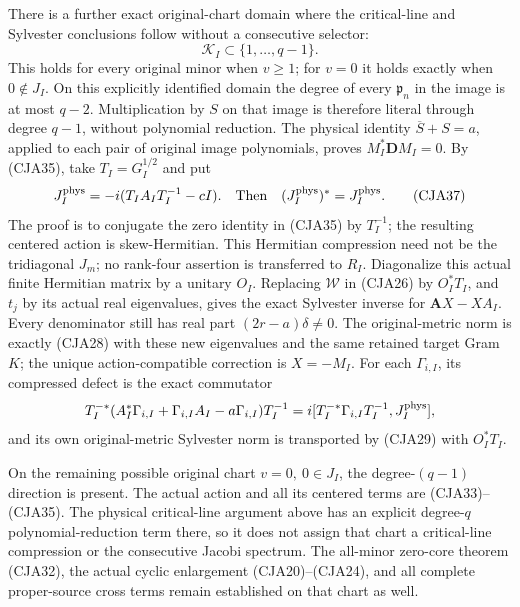 There is a further exact original-chart domain where the
critical-line and Sylvester conclusions follow without a
consecutive selector:
\begin{equation}
 \mathcal K_I\subset\{1,\ldots,q-1\}.
 \tag{CJA36}
\end{equation}
This holds for every original minor when \(v\geq1\); for \(v=0\)
it holds exactly when \(0\notin J_I\).
On this explicitly identified domain the degree of every
\(\mathfrak p_n\) in the image is at most \(q-2\).
Multiplication by \(S\) on that image is therefore literal
through degree \(q-1\), without polynomial reduction.
The physical identity \(\overline S+S=a\), applied to each pair
of original image polynomials, proves
\(M_I^*\mathbf DM_I=0\).
By (CJA35), take \(T_I=G_I^{1/2}\) and put
\begin{equation}
 J_I^{\rm phys}=-i(T_IA_IT_I^{-1}-cI).
 \quad\text{Then}\quad
 (J_I^{\rm phys})^*=J_I^{\rm phys}.
 \tag{CJA37}
\end{equation}
The proof is to conjugate the zero identity in (CJA35) by
\(T_I^{-1}\); the resulting centered action is skew-Hermitian.
This Hermitian compression need not be the tridiagonal \(J_m\);
no rank-four assertion is transferred to \(R_I\).
Diagonalize this actual finite Hermitian matrix by a unitary
\(O_I\).  Replacing \(\mathcal W\) in (CJA26) by \(O_I^*T_I\),
and \(t_j\) by its actual real eigenvalues, gives the exact
Sylvester inverse for
\(\mathbf AX-XA_I\).
Every denominator still has real part \((2r-a)\delta\ne0\).
The original-metric norm is exactly (CJA28) with these new
eigenvalues and the same retained target Gram \(K\);
the unique action-compatible correction is \(X=-M_I\).
For each \(\Gamma_{i,I}\), its compressed defect is the exact
commutator
\[
 T_I^{-*}(A_I^*\Gamma_{i,I}+\Gamma_{i,I}A_I-a\Gamma_{i,I})T_I^{-1}
  =i[T_I^{-*}\Gamma_{i,I}T_I^{-1},J_I^{\rm phys}],
 \]
and its own original-metric Sylvester norm is transported by
(CJA29) with \(O_I^*T_I\).

On the remaining possible original chart \(v=0,\ 0\in J_I\),
the degree-\((q-1)\) direction is present.
The actual action and all its centered terms are (CJA33)--(CJA35).
The physical critical-line argument above has an explicit
degree-\(q\) polynomial-reduction term there, so it does not
assign that chart a critical-line compression or the
consecutive Jacobi spectrum.
The all-minor zero-core theorem (CJA32), the actual cyclic
enlargement (CJA20)--(CJA24), and all complete proper-source
cross terms remain established on that chart as well.


